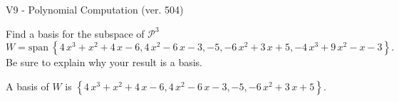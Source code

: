 \begin{exercise}
  \begin{exerciseTitle}V9 - Polynomial Computation (ver. 504)\end{exerciseTitle}
  \begin{exerciseStatement}
    Find a basis for the subspace of \(\mathcal{P}^3\) 
\[W=\mathrm{span}\ \left\{4 \, x^{3} + x^{2} + 4 \, x - 6 , 4 \, x^{2} - 6 \, x - 3 , -5 , -6 \, x^{2} + 3 \, x + 5 , -4 \, x^{3} + 9 \, x^{2} - x - 3\right\}.\]
 Be sure to explain why your result is a basis.


  \end{exerciseStatement}
  \begin{exerciseAnswer}
   A basis of \(W\) is  \(\left\{4 \, x^{3} + x^{2} + 4 \, x - 6 , 4 \, x^{2} - 6 \, x - 3 , -5 , -6 \, x^{2} + 3 \, x + 5\right\}\).
  


  \end{exerciseAnswer}
\end{exercise}